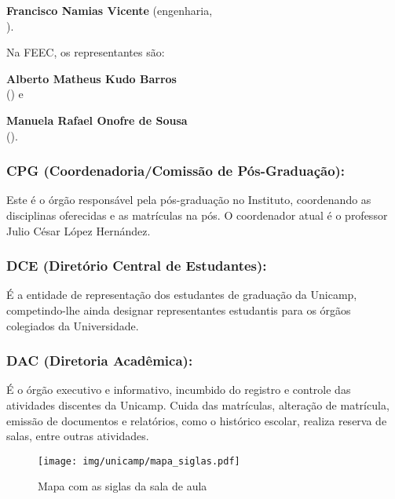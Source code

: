 \begin{compactitemize}
\item \textbf{Francisco Namias Vicente} (engenharia,
  \\ ).
\end{compactitemize}

Na FEEC, os representantes são:

\begin{compactitemize}
\item \textbf{Alberto Matheus Kudo Barros}
  \\ () e
\item \textbf{Manuela Rafael Onofre de Sousa}
  \\ ().
\end{compactitemize}

\subsubsection{CPG (Coordenadoria/Comissão de Pós-Graduação):} Este é o órgão
responsável pela pós-graduação no Instituto, coordenando as disciplinas
oferecidas e as matrículas na pós. O coordenador atual é o professor Julio
César López Hernández.

\subsubsection{DCE (Diretório Central de Estudantes):} É a entidade de
representação dos estudantes de graduação da Unicamp, competindo-lhe ainda
designar representantes estudantis para os órgãos colegiados da Universidade.

\subsubsection{DAC (Diretoria Acadêmica):} É o órgão executivo e informativo,
incumbido do registro e controle das atividades discentes da Unicamp. Cuida das
matrículas, alteração de matrícula, emissão de documentos e relatórios, como o
histórico escolar, realiza reserva de salas, entre outras atividades.

\begin{figure*}[hb!]
  \centering
  \texttt{[image: img/unicamp/mapa\_siglas.pdf]}
  \caption{Mapa com as siglas da sala de aula}
  \label{fig:mapa_siglas}
\end{figure*}


